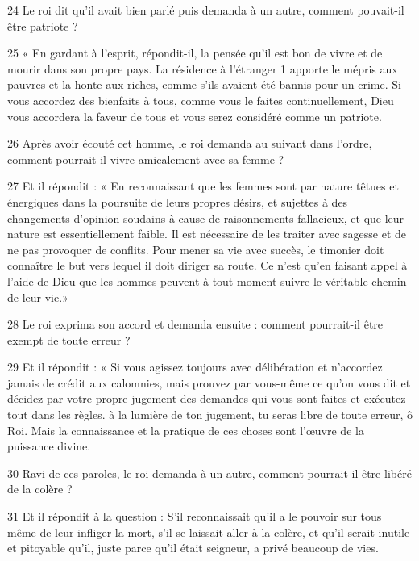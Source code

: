 \par 24 Le roi dit qu'il avait bien parlé puis demanda à un autre, comment pouvait-il être patriote ?

\par 25 « En gardant à l'esprit, répondit-il, la pensée qu'il est bon de vivre et de mourir dans son propre pays. La résidence à l'étranger 1 apporte le mépris aux pauvres et la honte aux riches, comme s'ils avaient été bannis pour un crime. Si vous accordez des bienfaits à tous, comme vous le faites continuellement, Dieu vous accordera la faveur de tous et vous serez considéré comme un patriote.

\par 26 Après avoir écouté cet homme, le roi demanda au suivant dans l'ordre, comment pourrait-il vivre amicalement avec sa femme ?

\par 27 Et il répondit : « En reconnaissant que les femmes sont par nature têtues et énergiques dans la poursuite de leurs propres désirs, et sujettes à des changements d’opinion soudains à cause de raisonnements fallacieux, et que leur nature est essentiellement faible. Il est nécessaire de les traiter avec sagesse et de ne pas provoquer de conflits. Pour mener sa vie avec succès, le timonier doit connaître le but vers lequel il doit diriger sa route. Ce n’est qu’en faisant appel à l’aide de Dieu que les hommes peuvent à tout moment suivre le véritable chemin de leur vie.»

\par 28 Le roi exprima son accord et demanda ensuite : comment pourrait-il être exempt de toute erreur ?

\par 29 Et il répondit : « Si vous agissez toujours avec délibération et n'accordez jamais de crédit aux calomnies, mais prouvez par vous-même ce qu'on vous dit et décidez par votre propre jugement des demandes qui vous sont faites et exécutez tout dans les règles. à la lumière de ton jugement, tu seras libre de toute erreur, ô Roi. Mais la connaissance et la pratique de ces choses sont l'œuvre de la puissance divine.

\par 30 Ravi de ces paroles, le roi demanda à un autre, comment pourrait-il être libéré de la colère ?

\par 31 Et il répondit à la question : S'il reconnaissait qu'il a le pouvoir sur tous même de leur infliger la mort, s'il se laissait aller à la colère, et qu'il serait inutile et pitoyable qu'il, juste parce qu'il était seigneur, a privé beaucoup de vies.


